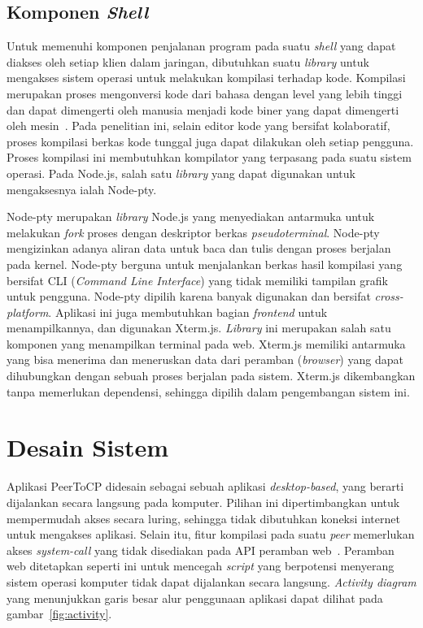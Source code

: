 \subsection{Komponen \textit{Shell}}

Untuk memenuhi komponen penjalanan program pada suatu \textit{shell} yang dapat diakses oleh setiap klien dalam jaringan, dibutuhkan suatu \textit{library} untuk mengakses sistem operasi untuk melakukan kompilasi terhadap kode. Kompilasi merupakan proses mengonversi kode dari bahasa dengan level yang lebih tinggi dan dapat dimengerti oleh manusia menjadi kode biner yang dapat dimengerti oleh mesin~\citep{aho1985compilers}. Pada penelitian ini, selain editor kode yang bersifat kolaboratif, proses kompilasi berkas kode tunggal juga dapat dilakukan oleh setiap pengguna. Proses kompilasi ini membutuhkan kompilator yang terpasang pada suatu sistem operasi. Pada Node.js, salah satu \textit{library} yang dapat digunakan untuk mengaksesnya ialah Node-pty.

Node-pty merupakan \textit{library} Node.js yang menyediakan antarmuka untuk melakukan \textit{fork} proses dengan deskriptor berkas \textit{pseudoterminal}. Node-pty mengizinkan adanya aliran data untuk baca dan tulis dengan proses berjalan pada kernel. Node-pty berguna untuk menjalankan berkas hasil kompilasi yang bersifat CLI (\textit{Command Line Interface}) yang tidak memiliki tampilan grafik untuk pengguna. Node-pty dipilih karena banyak digunakan dan bersifat \textit{cross-platform}. Aplikasi ini juga membutuhkan bagian \textit{frontend} untuk menampilkannya, dan digunakan Xterm.js. \textit{Library} ini merupakan salah satu komponen yang menampilkan terminal pada web. Xterm.js memiliki antarmuka yang bisa menerima dan meneruskan data dari peramban (\textit{browser}) yang dapat dihubungkan dengan sebuah proses berjalan pada sistem. Xterm.js dikembangkan tanpa memerlukan dependensi, sehingga dipilih dalam pengembangan sistem ini.

\section{Desain Sistem}

Aplikasi PeerToCP didesain sebagai sebuah aplikasi \textit{desktop-based}, yang berarti dijalankan secara langsung pada komputer. Pilihan ini dipertimbangkan untuk mempermudah akses secara luring, sehingga tidak dibutuhkan koneksi internet untuk mengakses aplikasi. Selain itu, fitur kompilasi pada suatu \textit{peer} memerlukan akses \textit{system-call} yang tidak disediakan pada API peramban web~\citep{v8, spidermonkey}. Peramban web ditetapkan seperti ini untuk mencegah \textit{script} yang berpotensi menyerang sistem operasi komputer tidak dapat dijalankan secara langsung. \textit{Activity diagram} yang menunjukkan garis besar alur penggunaan aplikasi dapat dilihat pada gambar~\ref{fig:activity}.

